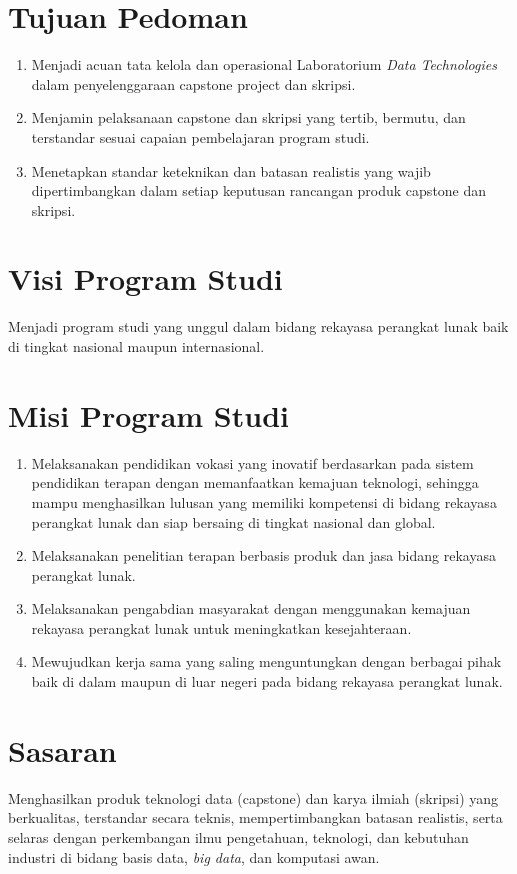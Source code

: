 \documentclass[12pt,a4paper]{report}
\begin{document}
\section{Tujuan Pedoman}
\begin{enumerate}
\item Menjadi acuan tata kelola dan operasional Laboratorium \emph{Data Technologies} dalam penyelenggaraan capstone project dan skripsi.
\item Menjamin pelaksanaan capstone dan skripsi yang tertib, bermutu, dan terstandar sesuai capaian pembelajaran program studi.
\item Menetapkan standar keteknikan dan batasan realistis yang wajib dipertimbangkan dalam setiap keputusan rancangan produk capstone dan skripsi.
\end{enumerate}

\section{Visi Program Studi}
Menjadi program studi yang unggul dalam bidang rekayasa perangkat lunak baik di tingkat nasional maupun internasional.

\section{Misi Program Studi}
\begin{enumerate}
\item Melaksanakan pendidikan vokasi yang inovatif berdasarkan pada sistem pendidikan terapan dengan memanfaatkan kemajuan teknologi, sehingga mampu menghasilkan lulusan yang memiliki kompetensi di bidang re\-ka\-ya\-sa pe\-rang\-kat lu\-nak dan siap bersaing di tingkat nasional dan global.
\item Melaksanakan penelitian terapan berbasis produk dan jasa bidang rekayasa perangkat lunak.
\item Melaksanakan pengabdian masyarakat dengan menggunakan kemajuan rekayasa perangkat lunak untuk meningkatkan kesejahteraan.
\item Mewujudkan kerja sama yang saling menguntungkan dengan berbagai pihak baik di dalam maupun di luar negeri pada bidang rekayasa perangkat lunak.
\end{enumerate}

\section{Sasaran}
Menghasilkan produk teknologi data (capstone) dan karya ilmiah (skripsi) yang berkualitas, terstandar secara teknis, mempertimbangkan batasan realistis, serta selaras dengan perkembangan ilmu pengetahuan, teknologi, dan kebutuhan industri di bidang basis data, \emph{big data}, dan komputasi awan.
\end{document}
